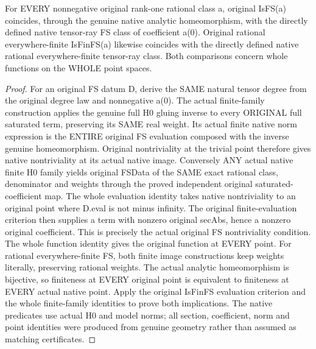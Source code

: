 \begin{theorem}
\label{thm:seven-native-tensor-ray-fs-class-comparison}
\leanok
For EVERY nonnegative original rank-one rational class a, original
IsFS(a) coincides, through the genuine native analytic homeomorphism,
with the directly defined native tensor-ray FS class of coefficient a(0).
Original rational everywhere-finite IsFinFS(a) likewise coincides with
the directly defined native rational everywhere-finite tensor-ray class.
Both comparisons concern whole functions on the WHOLE point spaces.
\end{theorem}
\begin{proof}
For an original FS datum D, derive the SAME natural tensor degree from
the original degree law and nonnegative a(0). The actual finite-family
construction applies the genuine full H0 gluing inverse to every ORIGINAL
full saturated term, preserving its SAME real weight. Its actual finite
native norm expression is the ENTIRE original FS evaluation composed with
the inverse genuine homeomorphism. Original nontriviality at the trivial
point therefore gives native nontriviality at its actual native image.
Conversely ANY actual native finite H0 family yields original FSData of
the SAME exact rational class, denominator and weights through the proved
independent original saturated-coefficient map. The whole evaluation
identity takes native nontriviality to an original point where D.eval is
not minus infinity. The original finite-evaluation criterion then supplies
a term with nonzero original secAbs, hence a nonzero original coefficient.
This is precisely the actual original FS nontriviality condition. The
whole function identity gives the original function at EVERY point.
For rational everywhere-finite FS, both finite image constructions keep
weights literally, preserving rational weights. The actual analytic
homeomorphism is bijective, so finiteness at EVERY original point is
equivalent to finiteness at EVERY actual native point. Apply the original
IsFinFS evaluation criterion and the whole finite-family identities to
prove both implications. The native predicates use actual H0 and model
norms; all section, coefficient, norm and point identities were produced
from genuine geometry rather than assumed as matching certificates.
\end{proof}

